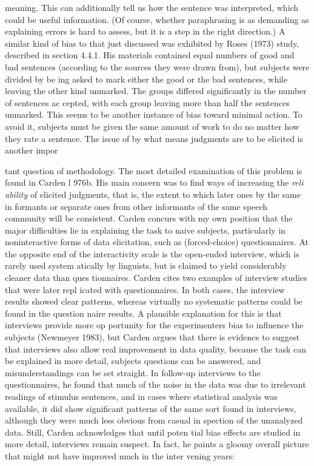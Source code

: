 \begin{styleTextbody}
meaning. This can additionally tell us how the sentence was interpreted, which could be useful information. (Of course, whether paraphrasing is as demanding as explaining errors is hard to assess, but it is a step in the right direction.) A similar kind of bias to that just discussed was exhibited by Rose{\textquotesingle}s (1973) study, described in section 4.4.1. His materials contained equal numbers of good and bad sentences (according to the sources they were drawn from), but subjects were divided by be\- ing asked to mark either the good or the bad sentences, while leaving the other kind unmarked. The groups differed significantly in the number of sentences ac\- cepted, with each group leaving more than half the sentences unmarked. This seems to be another instance of bias toward minimal action. To avoid it, subjects must be given the same amount of work to do no matter how they rate a sentence. The issue of by what means judgments are to be elicited is another impor\-
\end{styleTextbody}


\begin{styleTextbody}
tant question of methodology. The most detailed examination of this problem is found in Carden l 976b. His main concern was to find ways of increasing the \textit{reli\-}\textit{ }\textit{ability}\textit{ }of elicited judgments, that is, the extent to which later ones by the same in\- formants or separate ones from other informants of the same speech community will be consistent. Carden concurs with my own position that the major difficulties lie in explaining the task to naive subjects, particularly in noninteractive forms of data elicitation, such as (forced-choice) questionnaires. At the opposite end of the interactivity scale is the open-ended interview, which is rarely used system\- atically by linguists, but is claimed to yield considerably cleaner data than ques\- tionnaires. Carden cites two examples of interview studies that were later repl\- icated with questionnaires. In both cases, the interview results showed clear patterns, whereas virtually no systematic patterns could be found in the question\- naire results. A plausible explanation for this is that interviews provide more op\- portunity for the experimenter{\textquotesingle}s bias to influence the subjects (Newmeyer 1983), but Carden argues that there is evidence to suggest that interviews also allow real improvement in data quality, because the task can be explained in more detail, subjects{\textquotesingle} questions can be answered, and misunderstandings can be set straight. In follow-up interviews to the questionnaires, he found that much of the noise in the data was due to irrelevant readings of stimulus sentences, and in cases where statistical analysis was available, it did show significant patterns of the same sort found in interviews, although they were much less obvious from casual in\- spection of the unanalyzed data. Still, Carden acknowledges that until poten\- tial bias effects are studied in more detail, interviews remain suspect. In fact, he paints a gloomy overall picture that might not have improved much in the inter\- vening years:
\end{styleTextbody}


